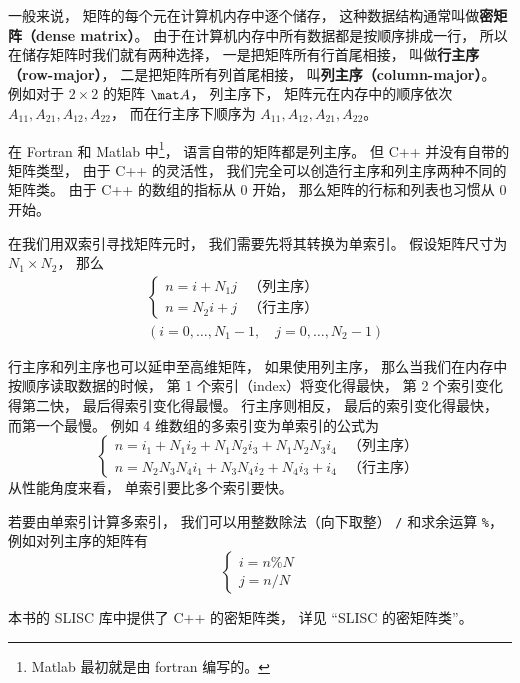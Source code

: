

一般来说， 矩阵的每个元在计算机内存中逐个储存， 这种数据结构通常叫做\textbf{密矩阵（dense matrix）}。 由于在计算机内存中所有数据都是按顺序排成一行， 所以在储存矩阵时我们就有两种选择， 一是把矩阵所有行首尾相接， 叫做\textbf{行主序（row-major）}， 二是把矩阵所有列首尾相接， 叫\textbf{列主序（column-major）}。 例如对于 $2 \times 2$ 的矩阵 $\mat A$， 列主序下， 矩阵元在内存中的顺序依次 $A_{11}, A_{21}, A_{12}, A_{22}$， 而在行主序下顺序为 $A_{11},A_{12},A_{21},A_{22}$。

在 Fortran 和 Matlab 中\footnote{Matlab 最初就是由 fortran 编写的。}， 语言自带的矩阵都是列主序。 但 C++ 并没有自带的矩阵类型， 由于 C++ 的灵活性， 我们完全可以创造行主序和列主序两种不同的矩阵类。 由于 C++ 的数组的指标从 0 开始， 那么矩阵的行标和列表也习惯从 0 开始。

在我们用双索引寻找矩阵元时， 我们需要先将其转换为单索引。 假设矩阵尺寸为 $N_1 \times N_2$， 那么
\begin{equation}
\begin{aligned}
&\begin{cases}
n = i + N_1 j  &\text{（列主序）}\\
n = N_2 i + j  &\text{（行主序）}
\end{cases}\\
&(i = 0, \dots, N_1-1,\quad j = 0, \dots, N_2-1)
\end{aligned}
\end{equation}

行主序和列主序也可以延申至高维矩阵， 如果使用列主序， 那么当我们在内存中按顺序读取数据的时候， 第 1 个索引（index）将变化得最快， 第 2 个索引变化得第二快， 最后得索引变化得最慢。 行主序则相反， 最后的索引变化得最快， 而第一个最慢。 例如 4 维数组的多索引变为单索引的公式为
\begin{equation}
\begin{cases}
n = i_1 + N_1 i_2 + N_1 N_2 i_3 + N_1 N_2 N_3 i_4  &\text{（列主序）}\\
n = N_2 N_3 N_4 i_1 + N_3 N_4 i_2 + N_4 i_3 + i_4  &\text{（行主序）}
\end{cases}
\end{equation}
从性能角度来看， 单索引要比多个索引要快。

若要由单索引计算多索引， 我们可以用整数除法（向下取整） \verb|/| 和求余运算 \verb|%|， 例如对列主序的矩阵有
\begin{equation}
\begin{cases}
i = n \% N\\
j = n / N
\end{cases}
\end{equation}

本书的 SLISC 库中提供了 C++ 的密矩阵类， 详见 “SLISC 的密矩阵类”。
